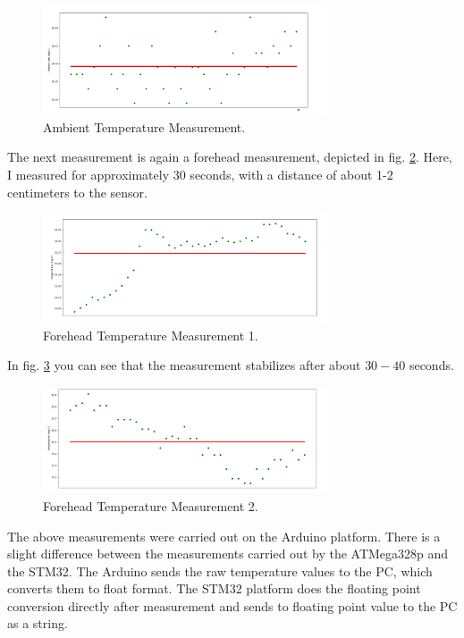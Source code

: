\documentclass{article}[12pt]
\begin{document}
\begin{figure}[H]
  \caption{Ambient Temperature Measurement.}
  \label{fig:ambienttemp}
  \centering
    \includegraphics[width=0.75\textwidth]{img/ambienttemp.png}
\end{figure}

The next measurement is again a forehead measurement, depicted in fig. \ref{fig:foreheadtemp1}. Here, I measured for approximately $30$ seconds, with a distance of about 1-2 centimeters to the sensor.

\begin{figure}[H]
  \caption{Forehead Temperature Measurement 1.}
  \label{fig:foreheadtemp1}
  \centering
    \includegraphics[width=0.75\textwidth]{img/foreheadtemp1.png}
\end{figure}

In fig. \ref{fig:foreheadtemp2} you can see that the measurement stabilizes after about $30-40$ seconds. 

\begin{figure}[H]
  \caption{Forehead Temperature Measurement 2.}
  \label{fig:foreheadtemp2}
  \centering
    \includegraphics[width=0.75\textwidth]{img/foreheadtemp2.png}
\end{figure}

The above measurements were carried out on the Arduino platform. There is a slight difference between the measurements carried out by the ATMega328p and the STM32. The Arduino sends the raw temperature values to the PC, which converts them to float format. The STM32 platform does the floating point conversion directly after measurement and sends to floating point value to the PC as a string.
\end{document}
